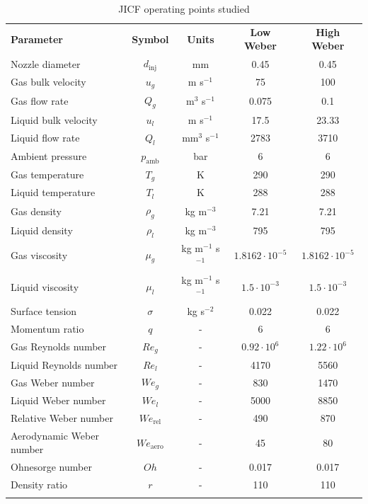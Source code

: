 \begin{table}[!h]
\centering
\caption{JICF operating points studied}
\begin{tabular}{lcccc}
\thickhline
\textbf{Parameter} & \textbf{Symbol} & \textbf{Units} &  \textbf{Low Weber} &  \textbf{High Weber} \\ %
\thickhline
Nozzle diameter & $d_\mathrm{inj}$ & mm & 0.45 & 0.45 \\
Gas bulk velocity & $u_g$ & m s$^{-1}$ & 75 & 100 \\
Gas flow rate & $Q_g$ & m$^3$ s$^{-1}$ & 0.075  & 0.1 \\
Liquid bulk velocity & $u_l$ & m s$^{-1}$ & 17.5  & 23.33 \\
Liquid flow rate & $Q_l$ & mm$^3$ s$^{-1}$ & 2783  & 3710 \\
Ambient pressure & $p_\mathrm{amb}$ & bar &  6 & 6 \\
Gas temperature & $T_g$ & K & 290 & 290 \\
Liquid temperature & $T_l$ & K & 288 & 288 \\
Gas density & $\rho_g$ & kg m$^{-3}$ &  7.21 & 7.21 \\
Liquid density & $\rho_l$ & kg m$^{-3}$ &  795 & 795  \\
Gas viscosity & $\mu_g$ & kg m$^{-1}$ s$^{-1}$ & $1.8162 \cdot 10^{-5}$ &  $1.8162 \cdot 10^{-5}$  \\
Liquid viscosity & $\mu_l$ & kg m$^{-1}$ s$^{-1}$ & $1.5 \cdot 10^{-3}$ & $1.5 \cdot 10^{-3}$  \\
Surface tension & $\sigma$ & kg s$^{-2}$ &  0.022 & 0.022  \\
\thickhline
Momentum ratio & $q$ & - & 6 & 6 \\
Gas Reynolds number & $Re_g$ & - & $0.92 \cdot 10^6$ & $1.22 \cdot 10^6$ \\
Liquid Reynolds number & $Re_l$ & - & 4170 & 5560 \\
Gas Weber number & $We_g$ & - & 830 & 1470 \\
Liquid Weber number & $We_l$ & - & 5000 & 8850 \\
Relative Weber number & $We_\mathrm{rel}$ & - & 490 & 870 \\
Aerodynamic Weber number & $We_\mathrm{aero}$ & - & 45 & 80 \\
Ohnesorge number & $Oh $ & - & 0.017 & 0.017 \\
Density ratio & $r$ & - & 110 & 110 \\
\thickhline
\end{tabular}
\label{tab:jicf_operating_conditions}
\end{table}

